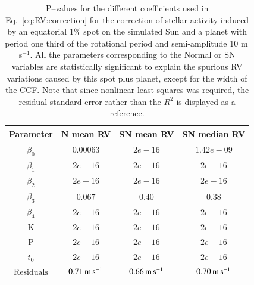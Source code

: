 \documentclass{aa}
\def\ms{\hbox{\,m\,s$^{-1}$}}         %
\begin{document}
\begin{table}
\begin{center}
\caption{P--values for the different coefficients used in Eq.~\ref{eq:RV:correction} for the correction of stellar activity induced by an equatorial 1\% spot on the simulated Sun and a planet with period one third of the rotational period and semi-amplitude 10\,\ms. All the parameters corresponding to the Normal or SN variables are statistically significant to explain the spurious RV variations caused by this spot plus planet, except for the width of the CCF. Note that since nonlinear least squares was required, the residual standard error rather than the $R^2$ is displayed as a reference.}
\label{table:spotplanet.test}
\begin{tabular}{|c|c|c|c|}
\hline
Parameter          & N mean RV         &   SN mean RV &   SN median RV \\
\hline
$\beta_{0}$            &    $0.00063$    & $2e-16$  & $1.42e-09$ \\
\hline
$\beta_{1}$            &    $2e-16$    & $2e-16$  & $2e-16$ \\
\hline
$\beta_{2}$            &     $2e-16$   & $2e-16$ & $2e-16$\\
\hline
$\beta_{3}$            &     $0.067$   &  $0.40$  & $0.38$\\
\hline
$\beta_{4}$            &     $2e-16$   &  $2e-16$ & $2e-16$\\
\hline
K            &     $2e-16$   &  $2e-16$   & $2e-16$ \\
\hline
P            &     $2e-16$   &  $2e-16$ & $2e-16$ \\
\hline
$t_{0}$            &     $2e-16$   &  $2e-16$ & $2e-16$ \\
\hline
$\text{Residuals}$      &     $0.71 \ms$    &  $ 0.66 \ms$ & $0.70 \ms$  \\
\hline
\end{tabular}
\end{center}
\end{table}
\end{document}
